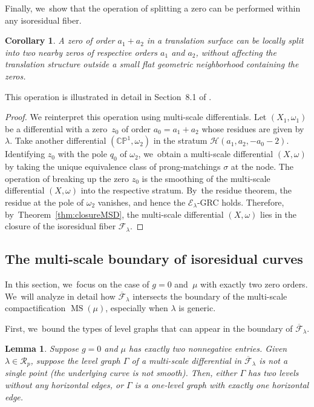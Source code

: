 \documentclass[JEP,XML,SOM,Unicode,NoFloatCountersInSection,published]{cedram}
\newcommand\PP{{\mathbb P}}
\newcommand\calE{{\mathcal E}}
\newcommand\calF{{\mathcal F}}
\DeclareMathOperator\MS{MS}
\newtheorem{cor}[thm]{Corollary}
\newtheorem{lem}[thm]{Lemma}
\theoremstyle{definition}
\begin{document}
Finally, we~show that the operation of splitting a zero can be performed within any isoresidual fiber.
\begin{cor}\label{cor:breakingup}
A zero of order $a_1+a_2$ in a translation surface can be locally split into two nearby zeros of respective orders $a_1$ and $a_2$, without affecting the translation structure outside a small flat geometric neighborhood containing the zeros.
\end{cor}
This operation is illustrated in detail in Section~8.1 of \cite{EMZ}.

\begin{proof}
We reinterpret this operation using multi-scale differentials.
Let $(X_{1},\omega_{1})$ be a differential with a zero~$z_{0}$ of order $a_0=a_{1}+a_{2}$ whose residues are given by $\lambda$. Take another differential $(\mathbb C\PP^1, \omega_2)$ in the stratum $\mathcal{H}(a_{1},a_{2},-a_0-2)$. Identifying $z_0$ with the pole $q_0$ of $\omega_{2}$, we~obtain a multi-scale differential $(X,\omega)$ by taking the unique equivalence class of prong-matchings $\sigma$ at the node. The operation of breaking up the zero $z_{0}$ is the smoothing of the multi-scale differential $(X,\omega)$ into the respective stratum. By~the residue theorem, the residue at the pole of $\omega_{2}$ vanishes, and hence the $\calE_{\lambda}$-GRC holds. Therefore, by~Theorem~\ref{thm:closureMSD}, the multi-scale differential $(X,\omega)$ lies in the closure of the isoresidual fiber $\calF_{\lambda}$.
\end{proof}

\subsection{The multi-scale boundary of isoresidual curves}\label{sub:boundary}

In this section, we~focus on the case of $g=0$ and~$\mu$ with exactly two zero orders. We~will analyze in detail how $\overline{\mathcal F}_\lambda$ intersects the boundary of the multi-scale compactification $\MS(\mu)$, especially when $\lambda$ is generic.

First, we~bound the types of level graphs that can appear in the boundary of $\overline{\mathcal F}_\lambda$.

\begin{lem}\label{lem:residues}
Suppose $g=0$ and $\mu$ has exactly two nonnegative entries. Given $\lambda\in \mathcal{R}_{p}$, suppose the level graph $\Gamma$ of a multi-scale differential in $\overline{\mathcal{F}}_{\lambda}$ is not a single point (\ie the underlying curve is not smooth). Then, either $\Gamma$ has two levels without any horizontal edges, or $\Gamma$ is a one-level graph with exactly one horizontal edge.
\end{lem}
\end{document}
